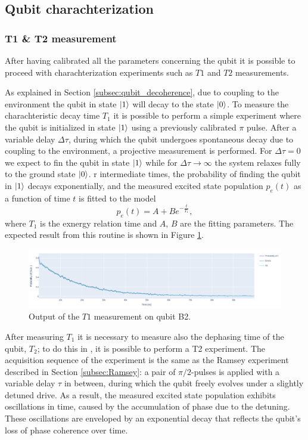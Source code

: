\subsection{Qubit charachterization}
\subsubsection{T1 \& T2 measurement}
After having calibrated all the parameters concerning the qubit it is possible to proceed with charachterization experiments such as $T1$ and $T2$ measurements.

As explained in Section \ref{subsec:qubit_decoherence}, due to coupling to the environment the qubit in state $\ket{1}$ will decay to the state $\ket{0}$. 
To measure the charachteristic decay time $T_1$ it is possible to perform a simple experiment where the qubit is initialized in state $\ket{1}$ using a previously calibrated $\pi$ pulse.
After a variable delay $\Delta\tau$, during which the qubit undergoes spontaneous decay due to coupling to the environment, a projective measurement is performed.
For $\Delta\tau = 0$ we expect to fin the qubit in state $\ket{1}$ while for $\Delta\tau \rightarrow \infty$ the system relaxes fully to the ground state $\ket{0}$.
r intermediate times, the probability of finding the qubit in $\ket{1}$ decays exponentially, and the measured excited state population $p_e(t)$ as a function of time $t$ is fitted to the model 
\begin{equation}\label{eq:T1}
    p_e(t) = A + Be^{-\frac{t}{T_1}},
\end{equation}
where $T_1$ is the exnergy relation time and $A$, $B$ are the fitting parameters.
The expected result from this routine is shown in Figure \ref{fig:t1}.

\begin{figure}[h!]
    \centering
    \includegraphics[width=\textwidth]{figures/png/t1.png}
    \caption{Output of the $T1$ measurement on qubit B2.}
    \label{fig:t1}
\end{figure}

After measuring $T_1$ it is necessary to measure also the dephasing time of the qubit, $T_2$; to do this in \Qibocal, it is possible to perform a T2 experiment.
The acquisition sequence of the experiment is the same as the Ramsey experiment described in Section \ref{subsec:Ramsey}: a pair of $\pi/2$-pulses is applied with a variable delay $\tau$ in between, during which the qubit freely evolves under a slightly detuned drive.
As a result, the measured excited state population exhibits oscillations in time, caused by the accumulation of phase due to the detuning. 
These oscillations are enveloped by an exponential decay that reflects the qubit’s loss of phase coherence over time.  

